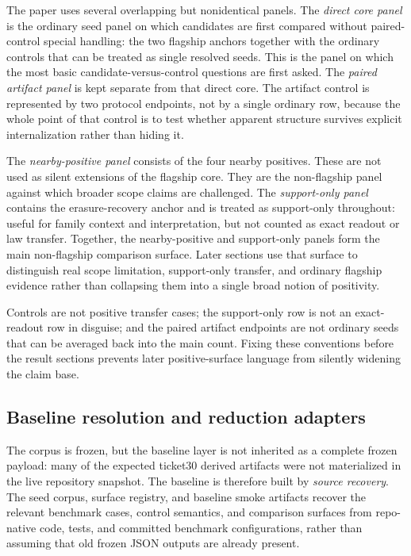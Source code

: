\documentclass[11pt]{article}
\theoremstyle{definition}
\begin{document}
The paper uses several overlapping but nonidentical panels. The \emph{direct core panel}
is the ordinary seed panel on which candidates are first compared without paired-control
special handling: the two flagship anchors together with the ordinary controls that can
be treated as single resolved seeds. This is the panel on which the most basic
candidate-versus-control questions are first asked. The \emph{paired artifact panel} is
kept separate from that direct core. The artifact control is represented by two protocol
endpoints, not by a single ordinary row, because the whole point of that control is to
test whether apparent structure survives explicit internalization rather than hiding it.

The \emph{nearby-positive panel} consists of the four nearby positives. These are not
used as silent extensions of the flagship core. They are the non-flagship panel against
which broader scope claims are challenged. The \emph{support-only panel} contains the
erasure-recovery anchor and is treated as support-only throughout: useful for family
context and interpretation, but not counted as exact readout or law transfer. Together,
the nearby-positive and support-only panels form the main non-flagship comparison
surface. Later sections use that surface to distinguish real scope limitation,
support-only transfer, and ordinary flagship evidence rather than collapsing them into a
single broad notion of positivity.

Controls are not positive transfer cases; the support-only row is not an exact-readout
row in disguise; and the paired artifact endpoints are not ordinary seeds that can be
averaged back into the main count. Fixing these conventions before the result sections
prevents later positive-surface language from silently widening the claim base.

\subsection{Baseline resolution and reduction adapters}

The corpus is frozen, but the baseline layer is not inherited as a complete frozen
payload: many of the expected ticket30 derived artifacts were not materialized in the
live repository snapshot. The baseline is therefore built by \emph{source recovery}.
The seed corpus, surface registry, and baseline smoke artifacts recover the relevant
benchmark cases, control semantics, and comparison surfaces from repo-native code,
tests, and committed benchmark configurations, rather than assuming that old frozen
JSON outputs are already present.
\end{document}
